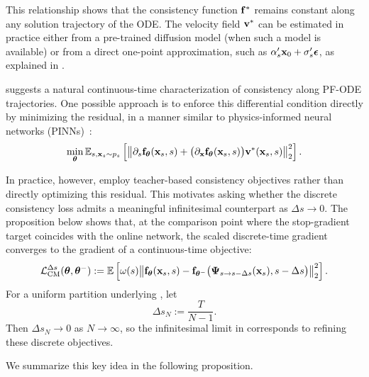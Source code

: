 This relationship shows that the consistency function ${\mathbf{f}}^*$ remains constant
along any solution trajectory of the ODE. The velocity field ${\mathbf{v}}^*$ can be
estimated in practice either from a pre-trained diffusion model (when such a
model is available) or from a direct one-point approximation, such as
$\alpha_s' {\mathbf{x}}_0 + \sigma_s' {\bm{\epsilon}}$, as explained in
.  

 suggests a natural continuous-time characterization of consistency along PF-ODE trajectories. One possible approach is to enforce this differential condition directly by minimizing the residual, in a manner similar to physics-informed neural networks (PINNs)~\citep{raissi2018deep,boffi2024flow}:
\begin{align*}
\min_{\bm{\theta}}
\mathbb{E}_{s,{\mathbf{x}}_s\sim p_s}
\left[
\left\|
\partial_s{\mathbf{f}}_{\bm{\theta}}({\mathbf{x}}_s,s)
+
\big(\partial_{{\mathbf{x}}}{\mathbf{f}}_{\bm{\theta}}({\mathbf{x}}_s,s)\big)
{\mathbf{v}}^*({\mathbf{x}}_s,s)
\right\|_2^2
\right].
\end{align*}

In practice, however, \citet{song2023consistency,lu2024simplifying} employ teacher-based consistency objectives rather than directly optimizing this residual. This motivates asking whether the discrete consistency loss admits a meaningful infinitesimal counterpart as $\Delta s \to 0$. The proposition below shows that, at the comparison point where the stop-gradient target coincides with the online network, the scaled discrete-time gradient converges to the gradient of a continuous-time objective:
\begin{align}\label{eq:cm-discrete}
\mathcal{L}_{\mathrm{CM}}^{\Delta s}({\bm{\theta}},{\bm{\theta}}^-)
:= \mathbb{E} \left[\omega(s) \big\|
{\mathbf{f}}_{{\bm{\theta}}}({\mathbf{x}}_s,s) -
{\mathbf{f}}_{{\bm{\theta}}^-} \big({\bm{\Psi}}_{s\to s-\Delta s}({\mathbf{x}}_s), s-\Delta s\big)
\big\|_2^2\right].
\end{align}
For a uniform partition underlying
, let
\[
\Delta s_N:=\frac{T}{N-1}.
\]
Then $\Delta s_N\to0$ as $N\to\infty$, so the infinitesimal limit in
 corresponds to refining these discrete objectives.
 

We summarize this key idea in the following proposition.


